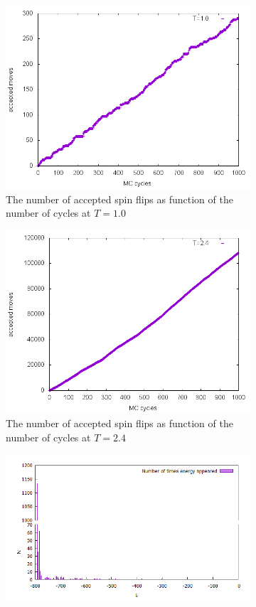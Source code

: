 \documentclass[10pt,a4paper]{article}
\begin{document}
\begin{figure}[h]
\centering
\begin{subfigure}{0.45\textwidth}
	\includegraphics[width=\textwidth]{b1.png}
	\caption{The number of accepted spin flips as function of the number of cycles at $T=1.0$\label{c_5}}
\end{subfigure}
\begin{subfigure}{0.45\textwidth}
	\includegraphics[width=\textwidth]{b24.png}
	\caption{The number of accepted spin flips as function of the number of cycles at $T=2.4$\label{c_6}}
\end{subfigure}
\begin{subfigure}{0.45\textwidth}
	\includegraphics[width=\textwidth]{d1.png}

\end{subfigure}
\end{figure}
\end{document}
